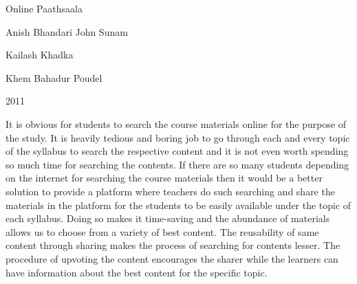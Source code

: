  \begin{conf-abstract}[]
 {Online Paathsaala}
 {
Anish Bhandari
John Sunam

Kailash Khadka

Khem Bahadur Poudel

 }
{2011}

It is obvious for students to search the course materials online for the purpose of the study. It is heavily tedious and boring job to go through each and every topic of the syllabus to search the respective content and it is not even worth spending so much time for searching the contents. If there are so many students depending on the internet for searching the course materials then it would be a better solution to provide a platform where teachers do such searching and share the materials in the platform for the students to be easily available under the topic of each syllabus. Doing so makes it time-saving and the abundance of materials allows us to choose from a variety of best content. The reusability of same content through sharing makes the process of searching for contents lesser. The procedure of upvoting the content encourages the sharer while the learners can have information about the best content for the specific topic.  
   
 \end{conf-abstract}
